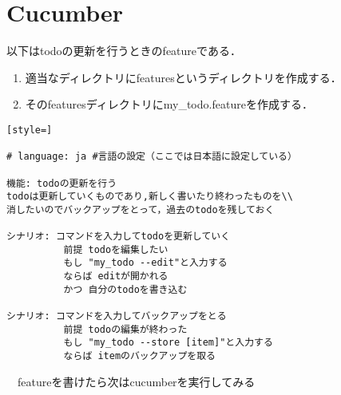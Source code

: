 \section{Cucumber}
以下はtodoの更新を行うときのfeatureである．

\begin{enumerate}
\item 適当なディレクトリにfeaturesというディレクトリを作成する．
\item そのfeaturesディレクトリにmy\_todo.featureを作成する．
\end{enumerate}\begin{lstlisting}[style=]

# language: ja #言語の設定（ここでは日本語に設定している）

機能: todoの更新を行う
todoは更新していくものであり,新しく書いたり終わったものを\\
消したいのでバックアップをとって，過去のtodoを残しておく

シナリオ: コマンドを入力してtodoを更新していく
          前提 todoを編集したい
          もし "my_todo --edit"と入力する
          ならば editが開かれる
          かつ 自分のtodoを書き込む

シナリオ: コマンドを入力してバックアップをとる
          前提 todoの編集が終わった
          もし "my_todo --store [item]"と入力する
          ならば itemのバックアップを取る

\end{lstlisting}
　featureを書けたら次はcucumberを実行してみる
